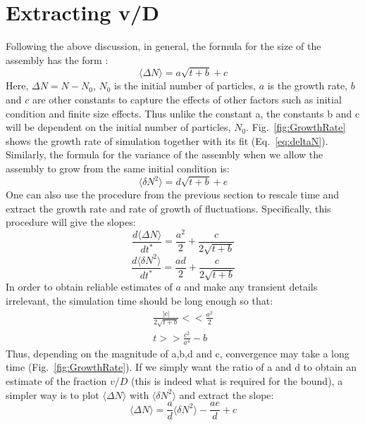 \documentclass[amsmath,preprintnumbers,10pt,nofootinbib,prl,twocolumn]{revtex4-1}
\begin{document}
\section{Extracting v/D}
Following the above discussion, in general, the formula for the size of the assembly has the form :
\begin{equation}
\label{eq:deltaN}
 \langle\Delta N\rangle=a\sqrt{t+b}+c
\end{equation}
Here, $\Delta N = N - N_0$, $N_0$ is the initial number of particles, $a$ is the growth rate, $b$ and  $c$ are other constants to capture the effects of other factors such as initial condition and finite size effects. Thus unlike the constant a, the constants b and c will be dependent on the initial number of particles, $N_0$. Fig.~\ref{fig:GrowthRate} shows the growth rate of simulation together with its fit (Eq.~\ref{eq:deltaN}). Similarly, the formula for the variance of the assembly when we allow the assembly to grow from the same initial condition is:
\begin{equation}
\langle\delta N^2\rangle =d\sqrt{t+b}+e
\end{equation}
One can also use the procedure from the previous section to rescale time and extract the growth rate and rate of growth of fluctuations. 
Specifically, this procedure will give the slopes:
\begin{equation}
\frac{d\langle\Delta N \rangle}{dt^{*}}=\frac{a^2}{2}+\frac{c}{2\sqrt{t+b}}
\end{equation}
\begin{equation}
\frac{d\langle\delta N^2 \rangle}{dt^{*}}=\frac{ad}{2}+\frac{c}{2\sqrt{t+b}}
\end{equation}
In order to obtain reliable estimates of $a$ and make any transient details irrelevant, the simulation time should be long enough so that: 
\begin{equation}
\begin{split}
\frac{|c|}{2\sqrt{t+b}}<<\frac{a^2}{2}
\\ t >>\frac{c^2}{a^4}-b
\end{split}
\end{equation}
Thus, depending on the magnitude of a,b,d and c, convergence may take a long time (Fig.~\ref{fig:GrowthRate}). 
If we simply want the ratio of a and d to obtain an estimate of the fraction $v/D$ (this is indeed what is required for the bound), a simpler way is to plot $\langle\Delta N\rangle$ with  $\langle\delta N^2 \rangle$ and extract the slope:
\begin{equation}
\label{eq:extractvd}
\langle\Delta N\rangle=\frac{a}{d}\langle\delta N^2 \rangle-\frac{ae}{d}+c
\end{equation}
\end{document}
